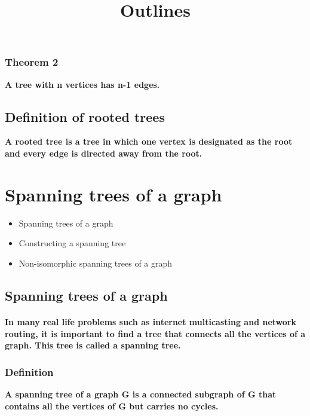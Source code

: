 \documentclass{article}
\begin{document}
\subsubsection{Theorem 2}

\textbf{A tree with n vertices has n-1 edges.}

\subsection{Definition of rooted trees}

\textbf{A rooted tree is a tree in which one vertex is designated as the root and every edge is directed away from the root.}


\section{Spanning trees of a graph}

\title{Outlines}
\begin{itemize}
  \item Spanning trees of a graph
  \item Constructing a spanning tree
  \item Non-isomorphic spanning trees of a graph
\end{itemize}

\subsection{Spanning trees of a graph}

\paragraph{In many real life problems such as internet multicasting and network routing, it is important to find a tree that connects all the vertices of a graph. This tree is called a spanning tree.}

\subsubsection{Definition}

\textbf{A spanning tree of a graph G is a connected subgraph of G that contains all the vertices of G but carries no cycles.}
\end{document}
